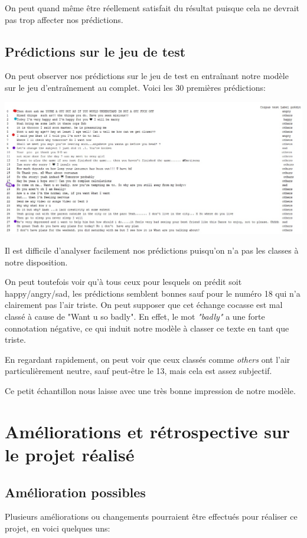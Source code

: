 \documentclass[12pt,french]{article}
\begin{document}
On peut quand même être réellement satisfait du résultat puisque cela ne devrait pas trop affecter nos prédictions.

\subsection*{Prédictions sur le jeu de test}
On peut observer nos prédictions sur le jeu de test en entraînant notre modèle sur le jeu d'entraînement au complet. Voici les 30 premières prédictions:

\includegraphics[width=\linewidth,keepaspectratio]{couleur_predictions}

Il est difficile d'analyser facilement nos prédictions puisqu'on n'a pas les classes à notre disposition. 

On peut toutefois voir qu'à tous ceux pour lesquels on prédit soit happy/angry/sad, les prédictions semblent bonnes sauf pour le numéro 18 qui n'a clairement pas l'air triste. On peut supposer que cet échange cocasse est mal classé à cause de "Want u so badly". En effet, le mot \emph{"badly"} a une forte connotation négative, ce qui induit notre modèle à classer ce texte en tant que triste. 

En regardant rapidement, on peut voir que ceux classés comme \emph{others} ont l'air particulièrement neutre, sauf peut-être le 13, mais cela est assez subjectif.

Ce petit échantillon nous laisse avec une très bonne impression de notre modèle.

\clearpage
\section{Améliorations et rétrospective sur le projet réalisé}
\subsection*{Amélioration possibles}
Plusieurs améliorations ou changements pourraient être effectués pour réaliser ce projet, en voici quelques uns:
\end{document}
